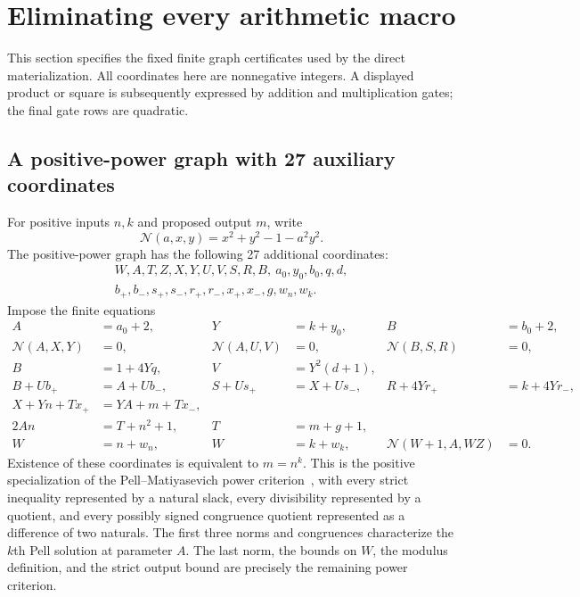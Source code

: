 \section{Eliminating every arithmetic macro}
\label{sec:primitives}

This section specifies the fixed finite graph certificates used by the
direct materialization. All coordinates here are nonnegative integers.
A displayed product or square is subsequently expressed by addition and
multiplication gates; the final gate rows are quadratic.

\subsection{A positive-power graph with 27 auxiliary coordinates}

For positive inputs $n,k$ and proposed output $m$, write
\[
 \mathcal N(a,x,y)=x^2+y^2-1-a^2y^2.
\]
The positive-power graph has the following 27 additional coordinates:
\[
\begin{gathered}
 W,A,T,Z,X,Y,U,V,S,R,B,\ a_0,y_0,b_0,q,d,\\
 b_+,b_-,s_+,s_-,r_+,r_-,x_+,x_-,g,w_n,w_k.
\end{gathered}
\]
Impose the finite equations
\begin{align}
 A&=a_0+2,&Y&=k+y_0,&B&=b_0+2,\label{eq:powbounds}\\
 \mathcal N(A,X,Y)&=0,&
 \mathcal N(A,U,V)&=0,&
 \mathcal N(B,S,R)&=0,\label{eq:pownorms}\\
 B&=1+4Yq,& V&=Y^2(d+1),\label{eq:powdiv}\\
 B+Ub_+&=A+Ub_-,&
 S+Us_+&=X+Us_-,&
 R+4Yr_+&=k+4Yr_-,\label{eq:powcong}\\
 X+Yn+Tx_+&=YA+m+Tx_-,\label{eq:powfinalcong}\\
 2An&=T+n^2+1,& T&=m+g+1,\label{eq:powmodulus}\\
 W&=n+w_n,&W&=k+w_k,&
 \mathcal N(W+1,A,WZ)&=0.\label{eq:powlast}
\end{align}
Existence of these coordinates is equivalent to $m=n^k$.
This is the positive specialization of the Pell--Matiyasevich
power criterion~\cite{pell,carneiro}, with every strict inequality
represented by a natural slack, every divisibility represented by a
quotient, and every possibly signed congruence quotient represented as
a difference of two naturals. The first three norms and congruences
characterize the $k$th Pell solution at parameter $A$. The last norm,
the bounds on $W$, the modulus definition, and the strict output bound
are precisely the remaining power criterion.

